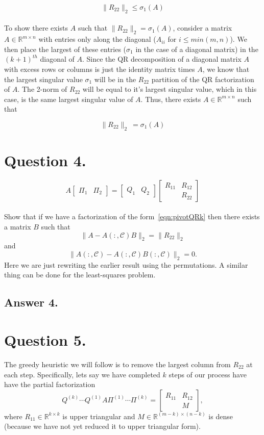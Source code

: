 \documentclass[12pt]{article}
\newcommand{\R}{\mathbb{R}}
\newcommand{\C}{\mathcal{C}}
\newcommand{\Rmn}{\R^{m\times n}}
\begin{document}
$$\|R_{22}\|_2\leq \sigma_1(A)$$ \\

To show there exists $A$ such that $\|R_{22}\|_2 = \sigma_1(A)$, consider a matrix $A\in \Rmn$ with entries only along the diagonal ($A_{ii}$ for $i \leq min(m,n)$). We then place the largest of these entries ($\sigma_1$ in the case of a diagonal matrix) in the $(k+1)^{th}$ diagonal of $A$. Since the QR decomposition of a diagonal matrix $A$ with excess rows or columns is just the identity matrix times $A$, we know that the largest singular value $\sigma_1$ will be in the $R_{22}$ partition of the QR factorization of $A$. The 2-norm of $R_{22}$ will be equal to it's largest singular value, which in this case, is the same largest singular value of $A$. Thus, there exists $A \in \Rmn$ such that  

$$\|R_{22}\|_2\ = \sigma_1(A)$$

\section*{Question 4.}
\begin{equation}
    \label{eqn:pivotQRk}
    A\begin{bmatrix}\Pi_1 & \Pi_2\end{bmatrix} = \begin{bmatrix} Q_1 & Q_2\end{bmatrix} \begin{bmatrix} R_{11} & R_{12} \\ & R_{22}\end{bmatrix}
\end{equation} \\

Show that if we have a factorization of the form~\cref{eqn:pivotQRk} then there exists a matrix $B$ such that
\[
    \|A - A(:,\C)B\|_2 = \|R_{22}\|_2
\]
and
\[
    \|A(:,\C) - A(:,\C)B(:,\C)\|_2 = 0.
\]
Here we are just rewriting the earlier result using the permutations. A similar thing can be done for the least-squares problem. 

\subsection*{Answer 4.}

\section*{Question 5.}
The greedy heuristic we will follow is to remove the largest column from $R_{22}$ at each step. Specifically, lets say we have completed $k$ steps of our process have have the partial factorization
\begin{equation}
    \label{eqn:PHQRk}
    Q^{(k)}\cdots Q^{(1)}A\Pi^{(1)}\cdots\Pi^{(k)} = \begin{bmatrix} R_{11} & R_{12} \\ & M\end{bmatrix},
\end{equation}
where $R_{11}\in\R^{k\times k}$ is upper triangular and $M\in\R^{(m-k)\times (n-k)}$ is dense (because we have not yet reduced it to upper triangular form). \\
\end{document}
